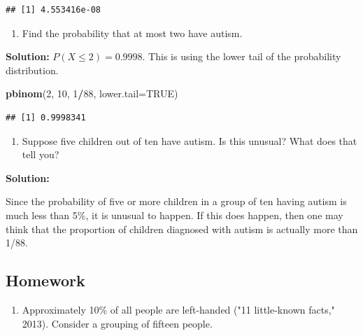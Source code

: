 \documentclass[
]{book}
\newenvironment{Shaded}{\begin{snugshade}}{\end{snugshade}}
\newcommand{\DataTypeTok}[1]{\textcolor[rgb]{0.13,0.29,0.53}{#1}}
\newcommand{\DecValTok}[1]{\textcolor[rgb]{0.00,0.00,0.81}{#1}}
\newcommand{\KeywordTok}[1]{\textcolor[rgb]{0.13,0.29,0.53}{\textbf{#1}}}
\newcommand{\NormalTok}[1]{#1}
\newcommand{\OperatorTok}[1]{\textcolor[rgb]{0.81,0.36,0.00}{\textbf{#1}}}
\newcommand{\OtherTok}[1]{\textcolor[rgb]{0.56,0.35,0.01}{#1}}
\providecommand{\tightlist}{%
  \setlength{\itemsep}{0pt}\setlength{\parskip}{0pt}}
\begin{document}
\begin{verbatim}
## [1] 4.553416e-08
\end{verbatim}

\begin{enumerate}
\def\labelenumi{\alph{enumi}.}
\setcounter{enumi}{5}
\tightlist
\item
  Find the probability that at most two have autism.
\end{enumerate}

\textbf{Solution:}
\(P(X \le 2)=0.9998\). This is using the lower tail of the probability distribution.

\begin{Shaded}
\begin{Highlighting}[]
\KeywordTok{pbinom}\NormalTok{(}\DecValTok{2}\NormalTok{, }\DecValTok{10}\NormalTok{, }\DecValTok{1}\OperatorTok{/}\DecValTok{88}\NormalTok{, }\DataTypeTok{lower.tail=}\OtherTok{TRUE}\NormalTok{)}
\end{Highlighting}
\end{Shaded}

\begin{verbatim}
## [1] 0.9998341
\end{verbatim}

\begin{enumerate}
\def\labelenumi{\alph{enumi}.}
\setcounter{enumi}{6}
\tightlist
\item
  Suppose five children out of ten have autism. Is this unusual? What does that tell you?
\end{enumerate}

\textbf{Solution:}

Since the probability of five or more children in a group of ten having autism is much less than 5\%, it is unusual to happen. If this does happen, then one may think that the proportion of children diagnosed with autism is actually more than 1/88.

\hypertarget{homework-1}{%
\subsection{Homework}\label{homework-1}}

\begin{enumerate}
\def\labelenumi{\arabic{enumi}.}
\tightlist
\item
  Approximately 10\% of all people are left-handed ("11 little-known facts," 2013). Consider a grouping of fifteen people.
\end{enumerate}
\end{document}
